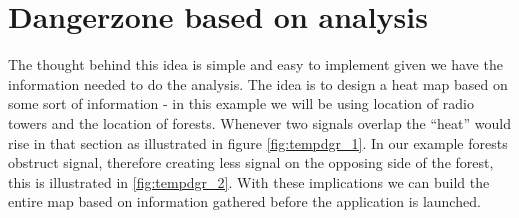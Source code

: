 \section{Dangerzone based on analysis}
\label{sec:dgrzone}

The thought behind this idea is simple and easy to implement given we have the information needed to do the analysis. The idea is to design a heat map based on some sort of information - in this example we will be using location of radio towers and  the location of forests. Whenever two signals overlap the ``heat'' would rise in that section as illustrated in figure \ref{fig:tempdgr_1}. In our example forests obstruct signal, therefore creating less signal on the opposing side of the forest, this is illustrated in \ref{fig:tempdgr_2}. With these implications we can build the entire map based on information gathered before the application is launched. 

